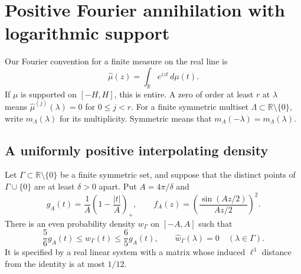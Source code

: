 
\section{Positive Fourier annihilation with logarithmic support}
\label{sec:annihilation}

Our Fourier convention for a finite measure on the real line is
\[
 \widehat\mu(z)=\int_{\mathbb R}e^{izt}\,d\mu(t).
\]
If $\mu$ is supported on $[-H,H]$, this is entire. A zero of order
at least $r$ at $\lambda$ means
$\widehat\mu^{(j)}(\lambda)=0$ for $0\le j<r$.
For a finite symmetric multiset $\Lambda\subset\mathbb R\setminus\{0\}$,
write $m_\Lambda(\lambda)$ for its multiplicity. Symmetric means that
$m_\Lambda(-\lambda)=m_\Lambda(\lambda)$.

\subsection{A uniformly positive interpolating density}

\begin{lemma}\label{lem:separated-filter}
Let $\Gamma\subset\mathbb R\setminus\{0\}$ be a finite symmetric set,
and suppose that the distinct points of $\Gamma\cup\{0\}$ are at least
$\delta>0$ apart. Put $A=4\pi/\delta$ and
\[
 g_A(t)=\frac1A\left(1-\frac{|t|}{A}\right)_+,
 \qquad
 f_A(z)=\left(\frac{\sin(Az/2)}{Az/2}\right)^2.
\]
There is an even probability density $w_\Gamma$ on $[-A,A]$ such that
\begin{equation}\label{eq:positive-envelope}
 \frac56 g_A(t)\le w_\Gamma(t)\le\frac65 g_A(t),
 \qquad
 \widehat w_\Gamma(\lambda)=0\quad(\lambda\in\Gamma).
\end{equation}
It is specified by a real linear system with a matrix whose induced
$\ell^1$ distance from the identity is at most $1/12$.
\end{lemma}

